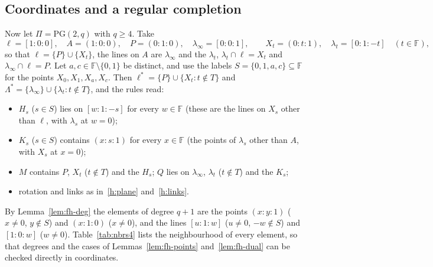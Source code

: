 \documentclass[11pt]{amsart}
\theoremstyle{definition}
\theoremstyle{remark}
\newcommand{\PG}{\mathrm{PG}}
\newcommand{\F}{\mathbb{F}}
\newcommand{\pnt}[3]{({#1}{:}{#2}{:}{#3})}
\newcommand{\lin}[3]{[{#1}{:}{#2}{:}{#3}]}
\newcommand{\lam}{\lambda}
\begin{document}
\subsection{Coordinates and a regular completion}
Now let $\Pi=\PG(2,q)$ with $q\ge4$. Take
\[
\ell=\lin100,\quad A=\pnt100,\quad P=\pnt010,\quad \lam_\infty=\lin001,\qquad X_t=\pnt0t1,\quad \lam_t=\lin01{-t}\quad(t\in\F),
\]
so that $\ell=\{P\}\cup\{X_t\}$, the lines on $A$ are $\lam_\infty$ and the $\lam_t$, $\lam_t\cap\ell=X_t$ and $\lam_\infty\cap\ell=P$. Let $a,c\in\F\setminus\{0,1\}$ be distinct, and use the labels $S=\{0,1,a,c\}\subseteq\F$ for the points $X_0,X_1,X_a,X_c$. Then $\ell^*=\{P\}\cup\{X_t:t\notin T\}$ and $\Lambda^*=\{\lam_\infty\}\cup\{\lam_t:t\notin T\}$, and the rules read:
\begin{itemize}[leftmargin=1.5em]
\item $H_s$ ($s\in S$) lies on $\lin w1{-s}$ for every $w\in\F$ (these are the lines on $X_s$ other than $\ell$, with $\lam_s$ at $w=0$);
\item $K_s$ ($s\in S$) contains $\pnt xs1$ for every $x\in\F$ (the points of $\lam_s$ other than $A$, with $X_s$ at $x=0$);
\item $M$ contains $P$, $X_t$ ($t\notin T$) and the $H_s$; $Q$ lies on $\lam_\infty$, $\lam_t$ ($t\notin T$) and the $K_s$;
\item rotation and links as in~\ref{h:plane} and~\ref{h:links}.
\end{itemize}
By Lemma~\ref{lem:fh-deg} the elements of degree $q+1$ are the points $\pnt xy1$ ($x\ne0$, $y\notin S$) and $\pnt x10$ ($x\ne0$), and the lines $\lin u1w$ ($u\ne0$, $-w\notin S$) and $\lin10w$ ($w\ne0$). Table~\ref{tab:nbrs4} lists the neighbourhood of every element, so that degrees and the cases of Lemmas~\ref{lem:fh-points} and~\ref{lem:fh-dual} can be checked directly in coordinates.
\end{document}
